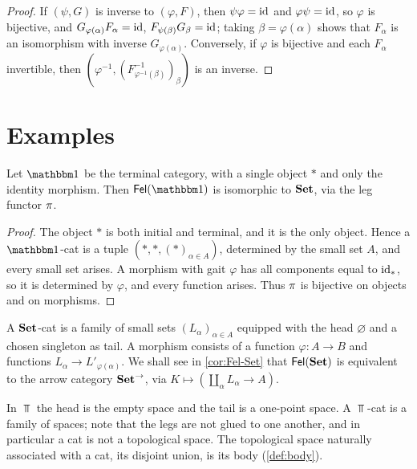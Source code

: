 \begin{proof}
If $(\psi,G)$ is inverse to $(\varphi,F)$, then $\psi\varphi=\mathrm{id}$ and
$\varphi\psi=\mathrm{id}$, so $\varphi$ is bijective, and $G_{\varphi(\alpha)}F_\alpha=\mathrm{id}$,
$F_{\psi(\beta)}G_\beta=\mathrm{id}$; taking $\beta=\varphi(\alpha)$ shows that $F_\alpha$
is an isomorphism with inverse $G_{\varphi(\alpha)}$. Conversely, if $\varphi$ is
bijective and each $F_\alpha$ invertible, then
$(\varphi^{-1},(F_{\varphi^{-1}(\beta)}^{-1})_\beta)$ is an inverse.
\end{proof}

\section{Examples}\label{sec:examples}

\begin{proposition}\label{prop:Fel-point}
Let $\one$ be the terminal category, with a single object $*$ and only the
identity morphism. Then $\Fel(\one)$ is isomorphic to $\mathbf{Set}$, via the leg
functor $\pi$.
\end{proposition}

\begin{proof}
The object $*$ is both initial and terminal, and it is the only object. Hence a
$\one$-cat is a tuple $(*,*,(*)_{\alpha\in A})$, determined by the small set
$A$, and every small set arises. A morphism with gait $\varphi$ has all
components equal to $\mathrm{id}_*$, so it is determined by $\varphi$, and every
function arises. Thus $\pi$ is bijective on objects and on morphisms.
\end{proof}

\begin{example}[Sets]\label{ex:set-cats}
A $\mathbf{Set}$-cat is a family of small sets $(L_\alpha)_{\alpha\in A}$ equipped with
the head $\varnothing$ and a chosen singleton as tail. A morphism consists of
a function $\varphi\colon A\to B$ and functions $L_\alpha\to L'_{\varphi(\alpha)}$.
We shall see in \cref{cor:Fel-Set} that $\mathsf{Fel}(\mathbf{Set})$ is equivalent to the
arrow category $\mathbf{Set}^{\to}$, via $K\mapsto(\coprod_\alpha L_\alpha\to A)$.
\end{example}

\begin{example}[Spaces]\label{ex:top-cats}
In $\Top$ the head is the empty space and the tail is a one-point space. A
$\Top$-cat is a family of spaces; note that the legs are not glued to one
another, and in particular a cat is not a topological space. The topological
space naturally associated with a cat, its disjoint union, is its body
(\cref{def:body}).
\end{example}

